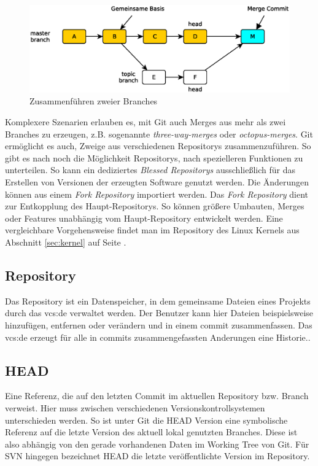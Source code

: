 \begin{figure}[hb]
  \centering
  \includegraphics[scale=0.60]{images/merge.eps}
  \caption{Zusammenführen zweier Branches}
  \label{fig:merge}
\end{figure}

Komplexere Szenarien erlauben es, mit Git auch Merges aus mehr als zwei
Branches zu erzeugen, z.B. sogenannte \textit{three-way-merges} oder
\textit{octopus-merges}\cite[S.~87]{gitosp}. Git ermöglicht es auch, Zweige aus
verschiedenen Repositorys zusammenzuführen. So gibt es nach \cite[3]{gitwf}
noch die Möglichkeit Repositorys, nach spezielleren Funktionen zu unterteilen.
So kann ein dediziertes \textit{Blessed Repositorys} ausschließlich für das
Erstellen von Versionen der erzeugten Software genutzt werden. Die Änderungen
können aus einem \textit{Fork Repository} importiert werden. Das \textit{Fork
Repository} dient zur Entkopplung des Haupt-Repositorys. So können größere
Umbauten, Merges oder Features unabhängig vom Haupt-Repository entwickelt
werden\cite[S.~123]{gitwf}. Eine vergleichbare Vorgehensweise findet man im
Repository des Linux Kernels\cite{link:linuxgit} aus Abschnitt \ref{sec:kernel}
auf Seite \pageref{sec:kernel}.

\subsection{Repository}\label{sec:repository}
Das Repository ist ein Datenspeicher, in dem gemeinsame Dateien eines Projekts
durch das \acrlong{vcs:de} verwaltet werden. Der Benutzer kann hier Dateien
beispielsweise hinzufügen, entfernen oder verändern und in einem \gls{commit}
zusammenfassen. Das \acrlong{vcs:de} erzeugt für alle in \glspl{commit}
zusammengefassten Anderungen eine Historie.\cite[S.~38]{hagen:1678}.

\subsection{HEAD}\label{sec:head}
Eine Referenz, die auf den letzten Commit im aktuellen Repository bzw. Branch
verweist. Hier muss zwischen verschiedenen Versionskontrollsystemen
unterschieden werden. So ist unter Git die HEAD Version eine symbolische
Referenz auf die letzte Version des aktuell lokal genutzten Branches. Diese ist
also abhängig von den gerade vorhandenen Daten im Working Tree von
Git\cite[S.~20]{gitosp}. Für SVN hingegen bezeichnet HEAD die letzte
veröffentlichte Version im Repository.

